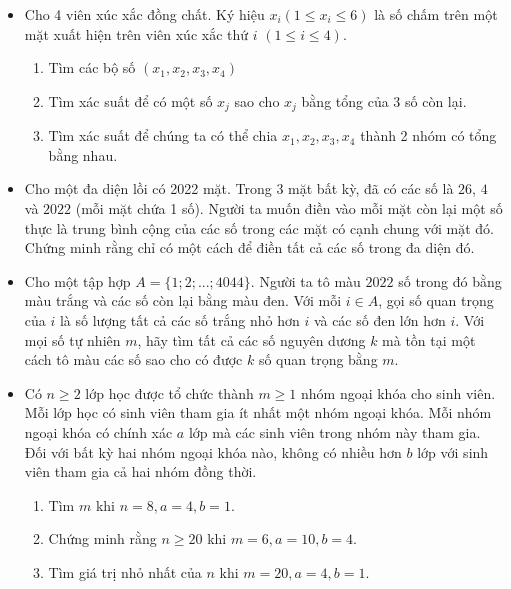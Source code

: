 \documentclass[11pt]{scrartcl}
\begin{document}
\begin{itemize}[label=, leftmargin=0em, itemsep=-0em]
    \item \begin{btvn}
        Cho 4 viên xúc xắc đồng chất. Ký hiệu $x_i (1\le x_i \le 6)$ là số chấm trên một mặt xuất hiện trên viên xúc xắc thứ $i$ $(1\le i \le 4)$.
        \begin{enumerate}[label=(\alph*)]
            \item Tìm các bộ số $(x_1,x_2,x_3,x_4)$
            \item Tìm xác suất để có một số $x_j$ sao cho $x_j$ bằng tổng của 3 số còn lại.
            \item Tìm xác suất để chúng ta có thể chia $x_1,x_2,x_3,x_4$ thành 2 nhóm có tổng bằng nhau.
        \end{enumerate}
    \end{btvn}

    \item \begin{btvn} Cho một đa diện lồi có 2022 mặt. Trong 3 mặt bất kỳ, đã có các số là $26$, $4$ và $2022$ (mỗi mặt chứa 1 số). Người ta muốn điền vào mỗi mặt còn lại một số thực là trung bình cộng của các số trong các mặt có cạnh chung với mặt đó. Chứng minh rằng chỉ có một cách để điền tất cả các số trong đa diện đó.
    \end{btvn}

    \item \begin{btvn} Cho một tập hợp $A=\{1;2;...;4044\}$. Người ta tô màu $2022$ số trong đó bằng màu trắng và các số còn lại bằng màu đen. Với mỗi $i\in A$, gọi số quan trọng của $i$ là số lượng tất cả các số trắng nhỏ hơn $i$ và các số đen lớn hơn $i$. Với mọi số tự nhiên $m$, hãy tìm tất cả các số nguyên dương $k$ mà tồn tại một cách tô màu các số sao cho có được $k$ số quan trọng bằng $m$.

    \end{btvn}

    \item \begin{btvn}
        Có $n \geq 2$ lớp học được tổ chức thành $m \geq 1$ nhóm ngoại khóa cho sinh viên. Mỗi lớp học có sinh viên tham gia ít nhất một nhóm ngoại khóa. Mỗi nhóm ngoại khóa có chính xác $a$ lớp mà các sinh viên trong nhóm này tham gia. Đối với bất kỳ hai nhóm ngoại khóa nào, không có nhiều hơn $b$ lớp với sinh viên tham gia cả hai nhóm đồng thời.
        \begin{enumerate}[label=(\alph*)]
            \item Tìm $m$ khi $n = 8, a = 4 , b = 1$.
            \item Chứng minh rằng $n \geq 20$ khi $m = 6 , a = 10 , b = 4$.
            \item Tìm giá trị nhỏ nhất của $n$ khi $m = 20 , a = 4 , b = 1$.
        \end{enumerate}
    \end{btvn}


\end{itemize}
\end{document}
